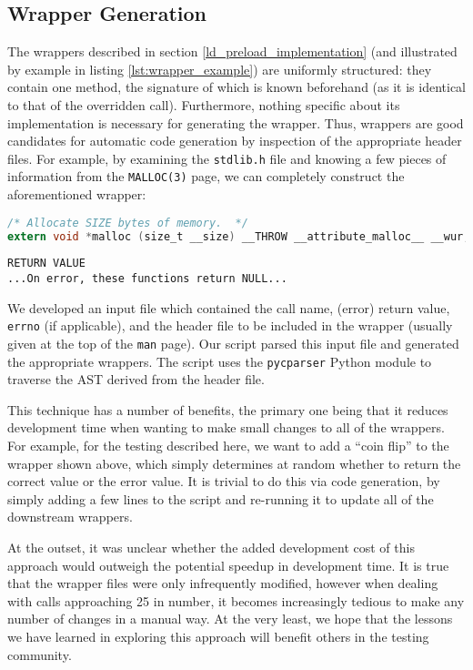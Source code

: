 \subsection{Wrapper Generation}
The wrappers described in section \ref{ld_preload_implementation} (and illustrated by example in listing \ref{lst:wrapper_example}) are uniformly structured: they contain one method, the signature of which is known beforehand (as it is identical to that of the overridden call). Furthermore, nothing specific about its implementation is necessary for generating the wrapper. Thus, wrappers are good candidates for automatic code generation by inspection of the appropriate header files. For example, by examining the \texttt{stdlib.h} file and knowing a few pieces of information from the \texttt{MALLOC(3)} page, we can completely construct the aforementioned wrapper:

\begin{lstlisting}[caption=Excerpt from \texttt{/usr/include/stdlib.h}, language=C]
/* Allocate SIZE bytes of memory.  */
extern void *malloc (size_t __size) __THROW __attribute_malloc__ __wur;
\end{lstlisting}

\begin{lstlisting}[caption=Excerpt from \texttt{MALLOC(3)}]
RETURN VALUE
...On error, these functions return NULL...
\end{lstlisting}

We developed an input file which contained the call name, (error) return value, \texttt{errno} (if applicable), and the header file to be included in the wrapper (usually given at the top of the \texttt{man} page). Our script parsed this input file and generated the appropriate wrappers. The script uses the \texttt{pycparser} Python module \cite{pycparser} to traverse the AST derived from the header file.

This technique has a number of benefits, the primary one being that it reduces development time when wanting to make small changes to all of the wrappers. For example, for the testing described here, we want to add a ``coin flip'' to the wrapper shown above, which simply determines at random whether to return the correct value or the error value. It is trivial to do this via code generation, by simply adding a few lines to the script and re-running it to update all of the downstream wrappers.

At the outset, it was unclear whether the added development cost of this approach would outweigh the potential speedup in development time. It is true that the wrapper files were only infrequently modified, however when dealing with calls approaching 25 in number, it becomes increasingly tedious to make any number of changes in a manual way. At the very least, we hope that the lessons we have learned in exploring this approach will benefit others in the testing community.